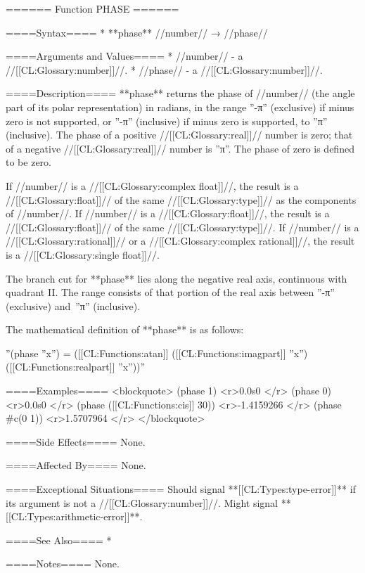 ====== Function PHASE ======

====Syntax====
  * **phase** //number// → //phase//

====Arguments and Values====
  * //number// - a //[[CL:Glossary:number]]//.
  * //phase// - a //[[CL:Glossary:number]]//.

====Description====
**phase** returns the phase of //number// (the angle part of its polar representation) in radians, in the range ''-π'' (exclusive) if minus zero is not supported, or ''-π'' (inclusive) if minus zero is supported, to ''π'' (inclusive). The phase of a positive //[[CL:Glossary:real]]// number is zero; that of a negative //[[CL:Glossary:real]]// number is ''π''. The phase of zero is defined to be zero.

If //number// is a //[[CL:Glossary:complex float]]//, the result is a //[[CL:Glossary:float]]// of the same //[[CL:Glossary:type]]// as the components of //number//. If //number// is a //[[CL:Glossary:float]]//, the result is a //[[CL:Glossary:float]]// of the same //[[CL:Glossary:type]]//. If //number// is a //[[CL:Glossary:rational]]// or a //[[CL:Glossary:complex rational]]//, the result is a //[[CL:Glossary:single float]]//.

The branch cut for **phase** lies along the negative real axis, continuous with quadrant II. The range consists of that portion of the real axis between ''-π'' (exclusive) and~''π'' (inclusive).

The mathematical definition of **phase** is as follows:

''(phase ''x'') = ([[CL:Functions:atan]] ([[CL:Functions:imagpart]] ''x'') ([[CL:Functions:realpart]] ''x''))''

====Examples====
<blockquote> 
(phase 1) <r>0.0s0 </r>
(phase 0) <r>0.0s0 </r>
(phase ([[CL:Functions:cis]] 30)) <r>-1.4159266 </r>
(phase #c(0 1)) <r>1.5707964 </r>
</blockquote>

====Side Effects====
None.

====Affected By====
None.

====Exceptional Situations====
Should signal **[[CL:Types:type-error]]** if its argument is not a //[[CL:Glossary:number]]//. Might signal **[[CL:Types:arithmetic-error]]**.

====See Also====
  * {\secref\FloatSubstitutability}

====Notes====
None.

   
